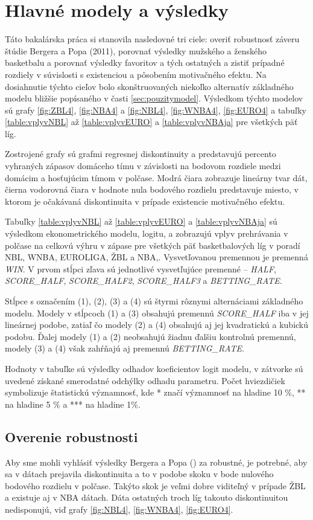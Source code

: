 \documentclass[
  digital, %
  twoside, %
  notable,   %
  lof,     %
  lot,     %
]{fithesis3}
\begin{document}
	\chapter{Hlavné modely a výsledky}
	Táto bakalárska práca si stanovila nasledovné tri ciele: overiť robustnosť záveru štúdie Bergera a Popa (2011), porovnať výsledky mužského a ženského basketbalu a porovnať výsledky favoritov a tých ostatných a zistiť prípadné rozdiely v súvislosti s existenciou a pôsobením motivačného efektu. Na dosiahnutie týchto cieľov bolo skonštruovaných niekoľko alternatív základného modelu bližšie popísaného v časti \ref{sec:pouzitymodel}. Výsledkom týchto modelov sú grafy \ref{fig:ZBL4}, \ref{fig:NBA4} a \ref{fig:NBL4}, \ref{fig:WNBA4}, \ref{fig:EURO4} a tabuľky \ref{table:vplyvNBL} až \ref{table:vplyvEURO} a \ref{table:vplyvNBAja} pre všetkých päť líg.
	
	Zostrojené grafy sú grafmi regresnej diskontinuity a predstavujú percento vyhraných zápasov domáceho tímu v závislosti na bodovom rozdiele medzi domácim a hosťujúcim tímom v polčase. Modrá čiara zobrazuje lineárny tvar dát, čierna vodorovná čiara v hodnote nula bodového rozdielu predstavuje miesto, v ktorom je očakávaná diskontinuita v prípade existencie motivačného efektu.

	Tabuľky \ref{table:vplyvNBL} až \ref{table:vplyvEURO} a \ref{table:vplyvNBAja} sú výsledkom ekonometrického modelu, logitu, a zobrazujú vplyv prehrávania v polčase na celkovú výhru v zápase pre všetkých päť basketbalových líg v poradí NBL, WNBA, EUROLIGA, ŽBL a NBA,. Vysvetľovanou premennou je premenná \textit{WIN}. V prvom stĺpci zľava sú jednotlivé vysvetľujúce premenné – \textit{HALF}, \textit{SCORE\_HALF}, \textit{SCORE\_HALF2}, \textit{SCORE\_HALF3} a \textit{BETTING\_RATE}. 

	Stĺpce s označením (1), (2), (3) a (4) sú štyrmi rôznymi alternáciami základného modelu. Modely v stĺpcoch (1) a (3) obsahujú premennú \textit{SCORE\_HALF} iba v jej lineárnej podobe, zatiaľ čo modely (2) a (4) obsahujú aj jej kvadratickú a kubickú podobu. Ďalej modely (1) a (2) neobsahujú žiadnu ďalšiu kontrolnú premennú, modely (3) a (4) však zahŕňajú aj premennú \textit{BETTING\_RATE}. 
	
	Hodnoty v tabuľke sú výsledky odhadov koeficientov logit modelu, v zátvorke sú uvedené získané smerodatné odchýlky odhadu parametru. Počet hviezdičiek symbolizuje štatistickú významnosť, kde * značí významnosť na hladine 10 \%, ** na hladine 5 \% a *** na hladine 1\%.

	\section{Overenie robustnosti}
	\label{sec:overenie}
	Aby sme mohli vyhlásiť výsledky Bergera a Popa (\citeyear{berger2011}) za robustné, je potrebné, aby sa v dátach prejavila diskontinuita a to v podobe skoku v bode nulového bodového rozdielu v polčase. Takýto skok je veľmi dobre viditeľný v prípade ŽBL a existuje aj v NBA dátach. Dáta ostatných troch líg takouto diskontinuitou nedisponujú, viď grafy \ref{fig:NBL4}, \ref{fig:WNBA4}, \ref{fig:EURO4}. 
	
\end{document}
